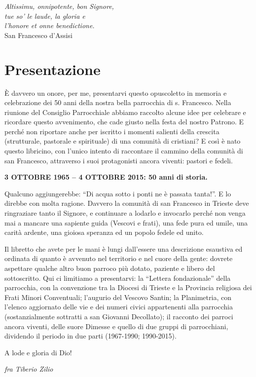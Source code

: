 \thispagestyle{empty}
\vspace*{15ex}
\begin{flushright}
\textit{Altissimu, onnipotente, bon Signore,\\
tue so’ le laude, la gloria e \\
l’honore et onne benedictione.\\}
\vspace{2ex}
\scriptsize{San Francesco d'Assisi}
\end{flushright}
\cleardoublepage

\chapter*{Presentazione}
\label{chap:abstract}
È davvero un onore, per me, presentarvi questo opuscoletto in memoria e celebrazione dei 
50 anni della nostra bella parrocchia di s. Francesco. Nella riunione del Consiglio Parrocchiale 
abbiamo raccolto alcune idee per celebrare e ricordare questo avvenimento, che cade giusto nella 
festa del nostro Patrono. E perché non riportare anche per iscritto i momenti salienti della crescita 
(strutturale, pastorale e spirituale) di una comunità di cristiani? E così è nato questo libricino, con 
l’unico intento di raccontare il cammino della comunità di san Francesco, attraverso i suoi 
protagonisti ancora viventi: pastori e fedeli.
\begin{center}
\bfseries
3 OTTOBRE 1965 – 4 OTTOBRE 2015: 50 anni di storia.
\end{center}

Qualcuno aggiungerebbe: “Di acqua sotto i ponti ne è passata tanta!”. E lo direbbe con molta 
ragione. Davvero la comunità di san Francesco in Trieste deve ringraziare tanto il Signore, e 
continuare a lodarlo e invocarlo perché non venga mai a mancare una sapiente guida (Vescovi e 
frati), una fede pura ed umile, una carità ardente, una gioiosa speranza ed un popolo fedele ed unito. 
\bigbreak

Il libretto che avete per le mani è lungi dall’essere una descrizione esaustiva ed ordinata di 
quanto è avvenuto nel territorio e nel cuore della gente: dovrete aspettare qualche altro buon 
parroco più dotato, paziente e libero del sottoscritto.
Qui ci limitiamo a presentarvi: la “Lettera fondazionale” della parrocchia, con la convenzione tra la 
Diocesi di Trieste e la Provincia religiosa dei Frati Minori Conventuali; l’augurio del Vescovo 
Santin; la Planimetria, con l’elenco aggiornato delle vie e dei numeri civici appartenenti alla 
parrocchia (sostanzialmente sottratti a san Giovanni Decollato); il racconto dei parroci  ancora 
viventi, delle suore Dimesse e quello di due gruppi di parrocchiani, dividendo il periodo in due parti 
(1967-1990; 1990-2015).
 
A lode e gloria di Dio!
\begin{flushright}
	\textit{fra Tiberio Zilio}
\end{flushright}